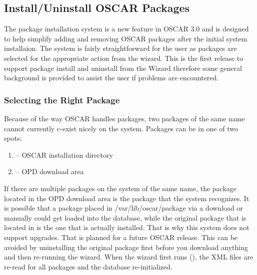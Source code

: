 \begchange
\subsection{Install/Uninstall OSCAR Packages}
\label{det:install-uninstall-packages}

The package installation system is a new feature in OSCAR 3.0 and is
designed to help simplify adding and removing OSCAR packages after the
initial system installaion.  The system is fairly straightforward for the
user as packages are selected for the appropriate action from the wizard.
This is the first release to support package install and uninstall from the
Wizard therefore some general background is provided to assist the user if
problems are encountered.


\subsubsection{Selecting the Right Package}
\label{det:select-package}

Because of the way OSCAR handles packages, two packages of the same name
cannot currently c-exist nicely on the system.  Packages can be in one of
two spots:

\begin{enumerate}

\item {} -- OSCAR installation directory
\item {} -- OPD download area

\end{enumerate}

If there are multiple packages on the system of the same name, the package
located in the OPD download area is the package that the system recognizes.
It is possible that a package placed in /var/lib/oscar/package via a download
or manually could get loaded into the database, while the original package
that is located in  is the one that is actually
installed.  That is why this system does not support upgrades.  That is
planned for a future OSCAR release.  This can be avoided by uninstalling the
original package first before you download anything and then re-running the
wizard.  When the wizard first runs (), the
XML files are re-read for all packages and the database re-initialized.

